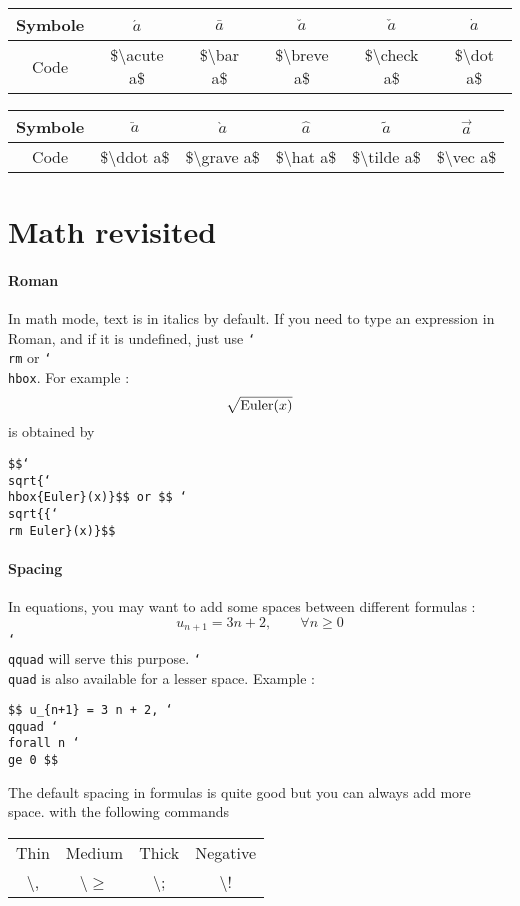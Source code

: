 \documentclass{article}
\newcommand\bSLASH{\char`\\}
\newcommand\BSLASH{\textbackslash}
\begin{document}
\begin{table}[h]
\centering
\begin{tabular}{c|c c c c c} 
Symbole & $\acute a$ & $\bar a$ & $\breve a$ & $\check a$ & $\dot a$ \\
\hline
Code  & \$\BSLASH acute a\$ & \$\BSLASH bar a\$ & \$\BSLASH breve a\$ & 
\$\BSLASH check a\$ & \$\BSLASH dot a\$
\end{tabular}

\vspace{10pt}
\begin{tabular}{c|c c c c c} 
Symbole & $\ddot a$ & $\grave a$ & $\hat a$ & $\tilde a$ & $\vec a$ \\
\hline
Code  &\$\BSLASH ddot a\$ & \$\BSLASH grave a\$ & \$\BSLASH hat a\$ 
& \$\BSLASH tilde a\$ & \$\BSLASH vec a\$
\end{tabular}
\end{table}

\section{Math revisited}
\paragraph{Roman} In math mode, text is in italics by default. If you need to
type an expression in Roman, and if it is undefined, just use {\tt \bSLASH rm} or
{\tt \bSLASH hbox}. For example :
$$ \sqrt{{\rm Euler}(x)}$$
is obtained by\\ 
\centerline{\tt \$\$\bSLASH sqrt\{\bSLASH hbox\{Euler\}(x)\}\$\$ {\rm or} 
\$\$ \bSLASH sqrt\{\{\bSLASH rm Euler\}(x)\}\$\$}

\paragraph{Spacing} In equations, you may want to add some spaces between
different formulas  :
$$ u_{n+1} = 3 n + 2, \qquad \forall n \ge 0 $$
\texttt{\bSLASH qquad} will serve this purpose. \texttt{\bSLASH quad} is 
also available for a lesser space. Example :\\
\centerline{\tt \$\$ u\_\{n+1\} = 3 n + 2, \bSLASH qquad \bSLASH forall n
\bSLASH ge 0 \$\$}

The default spacing in formulas is quite good but you can always add more space.
with the following commands
\begin{center}
\begin{tabular}{c c c c} 
Thin & Medium & Thick & Negative \\
\BSLASH, & \BSLASH $\ge$ & \BSLASH ;&  \BSLASH !
\end{tabular}
\end{center}
\end{document}
